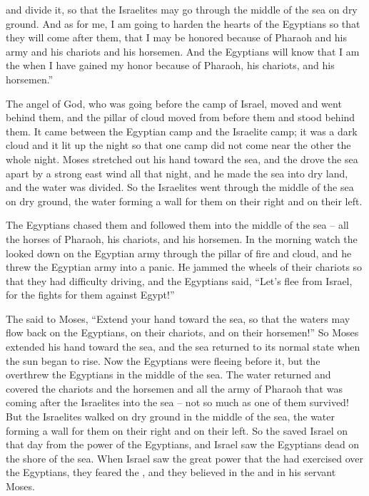 {and divide
it, so that the Israelites
may go through
the middle
of the sea
on dry ground.
And as for me, I am
going
to harden
the
hearts
of the Egyptians
so that they will come
after
them, that I may be honored
because of Pharaoh
and his army
and his chariots
and his horsemen.
And the Egyptians
will know
that
I am
the {}
when I have gained my honor
because of Pharaoh,
his chariots,
and his horsemen.”
\par }{\PP {}The angel
of God,
who was going
before
the camp
of Israel,
moved
and went behind
them, and the pillar
of cloud
moved
from before
them and stood
behind them.
It came
between
the Egyptian
camp
and the Israelite
camp;
it was
a dark
cloud
and it lit
up the
night
so that one
camp
did not
come near
the other
the whole
night.
Moses
stretched
out his hand
toward the sea,
and the
{}
drove
the sea
apart by a
strong
east
wind
all
that night,
and he made
the
sea
into dry land,
and the water
was divided.
So the Israelites
went
through the middle
of the sea
on dry ground,
the water
forming a wall
for them on their right
and on their left.
\par }{\PP {}The Egyptians
chased
them and followed
them into
the middle
of the sea
– all
the horses
of Pharaoh,
his chariots,
and his horsemen.
In the morning
watch
the {}
looked
down on the Egyptian
army
through the pillar
of fire
and cloud,
and he threw the
Egyptian
army
into a panic.
He jammed the wheels
of their chariots
so that they had difficulty
driving, and the Egyptians
said,
“Let’s flee
from Israel,
for
the {}
fights
for them against Egypt!”
\par }{\PP {}The
{}
said
to
Moses,
“Extend
your hand
toward the sea,
so that the waters
may flow back
on
the Egyptians,
on
their chariots,
and on
their horsemen!”
So Moses
extended
his hand
toward the sea,
and the sea
returned
to its normal
state
when
the sun began to rise. Now the Egyptians
were fleeing
before it, but the
{}
overthrew
the
Egyptians
in the middle
of the sea.
The water
returned
and covered
the
chariots
and the
horsemen
and all
the army
of Pharaoh
that was coming
after
the Israelites into the sea –
not
so much as
one
of them survived!
But the Israelites
walked
on dry ground
in the middle
of the sea,
the water
forming a wall
for them on their right
and on their left.
So the
{}
saved
Israel
on that day
from the power
of the Egyptians,
and Israel
saw
the Egyptians
dead
on
the shore
of the sea.
When Israel
saw
the great
power
that
the {}
had exercised
over the Egyptians,
they
feared
the {}, and they believed
in the
{}
and in his servant
Moses.


}
